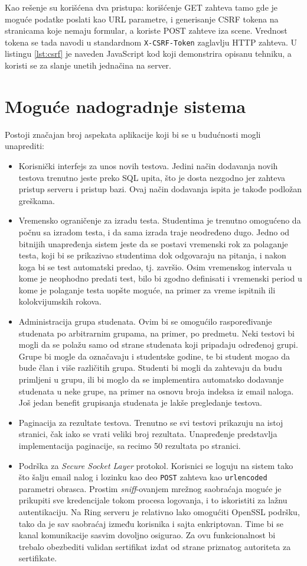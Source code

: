{Kao rešenje su korišćena dva pristupa: korišćenje GET zahteva tamo gde je moguće podatke poslati kao URL parametre, i generisanje CSRF tokena na stranicama koje nemaju formular, a koriste POST zahteve iza scene. Vrednost tokena se tada navodi u standardnom \texttt{X-CSRF-Token} zaglavlju HTTP zahteva. U listingu \ref{lst:csrf} je naveden JavaScript kod koji demonstrira opisanu tehniku, a koristi se za slanje unetih jednačina na server.

\section{Moguće nadogradnje sistema}
Postoji značajan broj aspekata aplikacije koji bi se u budućnosti mogli unaprediti:
\begin{itemize}
\item Korisnički interfejs za unos novih testova. Jedini način dodavanja novih testova trenutno jeste preko SQL upita, što je dosta nezgodno jer zahteva pristup serveru i pristup bazi. Ovaj način dodavanja ispita je takođe podložan greškama.
\item Vremensko ograničenje za izradu testa. Studentima je trenutno omogućeno da počnu sa izradom testa, i da sama izrada traje neodređeno dugo. Jedno od bitnijih unapređenja sistem jeste da se postavi vremenski rok za polaganje testa, koji bi se prikazivao studentima dok odgovaraju na pitanja, i nakon koga bi se test automatski predao, tj. završio. Osim vremenskog intervala u kome je neophodno predati test, bilo bi zgodno definisati i vremenski period u kome je polaganje testa uopšte moguće, na primer za vreme ispitnih ili kolokvijumskih rokova.
\item Administracija grupa studenata. Ovim bi se omogućilo raspoređivanje studenata po arbitrarnim grupama, na primer, po predmetu. Neki testovi bi mogli da se polažu samo od strane studenata koji pripadaju određenoj grupi. Grupe bi mogle da označavaju i studentske godine, te bi student mogao da bude član i više različitih grupa. Studenti bi mogli da zahtevaju da budu primljeni u grupu, ili bi moglo da se implementira automatsko dodavanje studenata u neke grupe, na primer na osnovu broja indeksa iz email naloga. Još jedan benefit grupisanja studenata je lakše pregledanje testova.
\item Paginacija za rezultate testova. Trenutno se svi testovi prikazuju na istoj stranici, čak iako se vrati veliki broj rezultata. Unapređenje predstavlja implementacija paginacije, sa recimo 50 rezultata po stranici.
\item Podrška za \textit{Secure Socket Layer} protokol. Korisnici se loguju na sistem tako što šalju email nalog i lozinku kao deo \texttt{POST} zahteva kao \texttt{urlencoded} parametri obrasca. Prostim \textit{sniff}-ovanjem mrežnog saobraćaja moguće je prikupiti sve kredencijale tokom procesa logovanja, i to iskoristiti za lažnu autentikaciju. Na Ring serveru je relativno lako omogućiti OpenSSL podršku, tako da je sav saobraćaj između korisnika i sajta enkriptovan. Time bi se kanal komunikacije sasvim dovoljno osigurao. Za ovu funkcionalnost bi trebalo obezbediti validan sertifikat izdat od strane priznatog autoriteta za sertifikate.

\end{itemize}}
